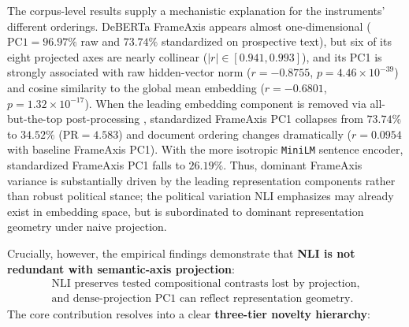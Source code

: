 The corpus-level results supply a mechanistic explanation for the instruments' different orderings. DeBERTa FrameAxis appears almost one-dimensional ($\mathrm{PC1} = 96.97\%$ raw and $73.74\%$ standardized on prospective text), but six of its eight projected axes are nearly collinear ($|r| \in [0.941, 0.993]$), and its PC1 is strongly associated with raw hidden-vector norm ($r=-0.8755$, $p=4.46 \times 10^{-39}$) and cosine similarity to the global mean embedding ($r=-0.6801$, $p=1.32 \times 10^{-17}$). When the leading embedding component is removed via all-but-the-top post-processing \citep{mu2018allbutthetop}, standardized FrameAxis PC1 collapses from $73.74\%$ to $34.52\%$ ($\mathrm{PR}=4.583$) and document ordering changes dramatically ($r=0.0954$ with baseline FrameAxis PC1). With the more isotropic \texttt{MiniLM} sentence encoder, standardized FrameAxis PC1 falls to $26.19\%$. Thus, dominant FrameAxis variance is substantially driven by the leading representation components rather than robust political stance; the political variation NLI emphasizes may already exist in embedding space, but is subordinated to dominant representation geometry under naive projection.

Crucially, however, the empirical findings demonstrate that \textbf{NLI is not redundant with semantic-axis projection}:
\begin{equation*}
    \begin{gathered}\text{NLI preserves tested compositional contrasts lost by projection,}\\\text{and dense-projection PC1 can reflect representation geometry.}\end{gathered}
\end{equation*}
The core contribution resolves into a clear \textbf{three-tier novelty hierarchy}:

